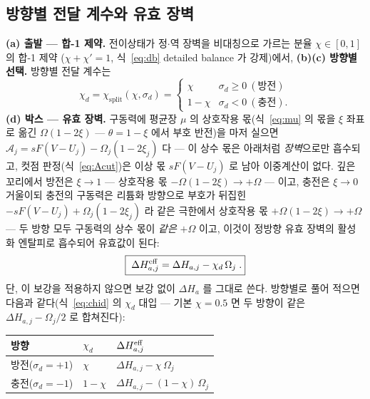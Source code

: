 \subsection{방향별 전달 계수와 유효 장벽}\label{sec:lag-chid}
\textbf{(a) 출발 --- 합-1 제약.} 전이상태가 정$\cdot$역 장벽을 비대칭으로 가르는 분율 $\chi\in[0,1]$ 의 합-1 제약
($\chi+\chi'=1$, 식~\eqref{eq:db} detailed balance 가 강제)에서, \textbf{(b)(c) 방향별 선택.} 방향별 전달 계수는
\begin{equation}
\chi_d=\chi_\mathrm{split}(\chi,\sigma_d)=
\begin{cases}\chi & \sigma_d\ge0\ (\text{방전})\\ 1-\chi & \sigma_d<0\ (\text{충전}).\end{cases}
\label{eq:chid}
\end{equation}
\textbf{(d) 박스 --- 유효 장벽.}
구동력에 평균장 $\mu$ 의 상호작용 몫(식~\eqref{eq:mu} 의 몫을 $\xi$ 좌표로 옮긴 $\Omega(1-2\xi)$ --- $\theta=1-\xi$ 에서 부호 반전)을 마저 실으면
$\mathcal A_j=sF(V-U_j)-\Omega_j(1-2\xi_j)$ 다 --- 이 상수 몫은 아래처럼 \emph{장벽}으로만 흡수되고, 컷점
판정(식~\eqref{eq:Acut})은 이상 몫 $sF(V-U_j)$ 로 남아 이중계산이 없다.
깊은 꼬리에서 방전은 $\xi\to1$ --- 상호작용 몫
$-\Omega(1-2\xi)\to+\Omega$ --- 이고, 충전은 $\xi\to0$ 거울이되 충전의 구동력은 리튬화 방향으로 부호가 뒤집힌
$-sF(V-U_j)+\Omega_j(1-2\xi_j)$ 라 같은 극한에서 상호작용 몫 $+\Omega(1-2\xi)\to+\Omega$ --- 두 방향 모두
구동력의 상수 몫이 \emph{같은} $+\Omega$ 이고, 이것이 정방향 유효 장벽의 활성화 엔탈피로 흡수되어 유효값이 된다:
\begin{equation}
\boxed{\;\Delta H_{a,j}^{\mathrm{eff}}=\Delta H_{a,j}-\chi_d\,\Omega_j\;.}
\label{eq:dHeff}
\end{equation}
단, 이 보강을 적용하지 않으면 보강 없이 $\Delta H_a$ 를 그대로 쓴다.
방향별로 풀어 적으면 다음과 같다(식~\eqref{eq:chid} 의 $\chi_d$ 대입 --- 기본 $\chi=0.5$ 면 두 방향이
같은 $\Delta H_{a,j}-\Omega_j/2$ 로 합쳐진다):
\begin{center}
\begin{tabular}{@{}lll@{}}
\toprule
방향 & $\chi_d$ & $\Delta H_{a,j}^{\mathrm{eff}}$ \\
\midrule
방전($\sigma_d=+1$) & $\chi$ & $\Delta H_{a,j}-\chi\,\Omega_j$ \\
충전($\sigma_d=-1$) & $1-\chi$ & $\Delta H_{a,j}-(1-\chi)\,\Omega_j$ \\
\bottomrule
\end{tabular}
\end{center}

